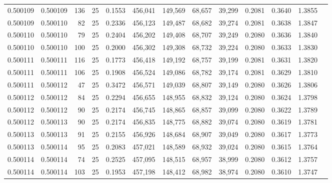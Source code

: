 \begin{tabular}{rrrrrrrrrrrrr}
0.500109 & 0.500109 & 136 &  25 &                                     0.1553 & 456,041 & 149,569 &  68,657 &  39,299 & 0.2081 & 0.3640 & 1.3855 \\
0.500109 & 0.500110 &  82 &  25 &                                     0.2336 & 456,123 & 149,487 &  68,682 &  39,274 & 0.2081 & 0.3638 & 1.3847 \\
0.500110 & 0.500110 &  79 &  25 &                                     0.2404 & 456,202 & 149,408 &  68,707 &  39,249 & 0.2080 & 0.3636 & 1.3840 \\
0.500110 & 0.500110 & 100 &  25 &                                     0.2000 & 456,302 & 149,308 &  68,732 &  39,224 & 0.2080 & 0.3633 & 1.3830 \\
0.500111 & 0.500111 & 116 &  25 &                                     0.1773 & 456,418 & 149,192 &  68,757 &  39,199 & 0.2081 & 0.3631 & 1.3820 \\
0.500111 & 0.500111 & 106 &  25 &                                     0.1908 & 456,524 & 149,086 &  68,782 &  39,174 & 0.2081 & 0.3629 & 1.3810 \\
0.500111 & 0.500112 &  47 &  25 &                                     0.3472 & 456,571 & 149,039 &  68,807 &  39,149 & 0.2080 & 0.3626 & 1.3806 \\
0.500112 & 0.500112 &  84 &  25 &                                     0.2294 & 456,655 & 148,955 &  68,832 &  39,124 & 0.2080 & 0.3624 & 1.3798 \\
0.500112 & 0.500112 &  90 &  25 &                                     0.2174 & 456,745 & 148,865 &  68,857 &  39,099 & 0.2080 & 0.3622 & 1.3789 \\
0.500112 & 0.500113 &  90 &  25 &                                     0.2174 & 456,835 & 148,775 &  68,882 &  39,074 & 0.2080 & 0.3619 & 1.3781 \\
0.500113 & 0.500113 &  91 &  25 &                                     0.2155 & 456,926 & 148,684 &  68,907 &  39,049 & 0.2080 & 0.3617 & 1.3773 \\
0.500113 & 0.500114 &  95 &  25 &                                     0.2083 & 457,021 & 148,589 &  68,932 &  39,024 & 0.2080 & 0.3615 & 1.3764 \\
0.500114 & 0.500114 &  74 &  25 &                                     0.2525 & 457,095 & 148,515 &  68,957 &  38,999 & 0.2080 & 0.3612 & 1.3757 \\
0.500114 & 0.500114 & 103 &  25 &                                     0.1953 & 457,198 & 148,412 &  68,982 &  38,974 & 0.2080 & 0.3610 & 1.3747 \\

\end{tabular}
